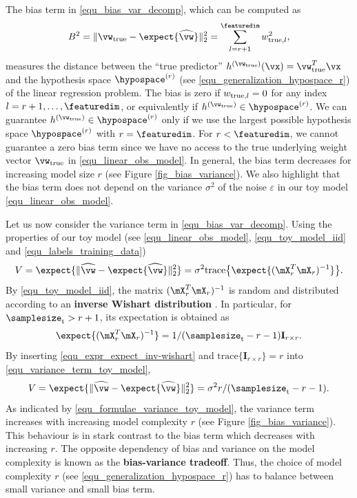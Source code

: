 \documentclass[12pt]{report}
\begin{document}
The bias term in \eqref{equ_bias_var_decomp}, which can be computed as 
\vspace*{-3mm}
\begin{equation}
\label{equ_def_bias_term}
B^{2} = \| \vw_{\rm true} - \expect \{ \widehat{\vw} \} \|^{2}_{2} = \sum_{l=r+1}^{\featuredim} w_{{\rm true},l}^2, 
\end{equation} 
measures the distance between the ``true predictor'' $h^{(\vw_{\rm true})}(\vx)=\vw_{\rm true}^{T} \vx$ and the 
hypothesis space $\hypospace^{(r)}$ (see \eqref{equ_generalization_hypospace_r}) of the linear regression problem. 
The bias is zero if $w_{{\rm true},l}=0$ for any index $l=r+1,\ldots,\featuredim$, or equivalently if $h^{(\vw_{\rm true})} \in \hypospace^{(r)}$. 
We can guarantee $h^{(\vw_{\rm true})} \in \hypospace^{(r)}$ only if we use the largest possible hypothesis 
space $\hypospace^{(r)}$ with $r=\featuredim$. For $r < \featuredim$, we cannot guarantee a zero bias term since we 
have no access to the true underlying weight vector $\vw_{\rm true}$ in \eqref{equ_linear_obs_model}. In general, the 
bias term decreases for increasing model size $r$ (see Figure \ref{fig_bias_variance}). We also highlight that the bias 
term does not depend on the variance $\sigma^{2}$ of the noise $\varepsilon$ in our toy model \eqref{equ_linear_obs_model}. 

Let us now consider the variance term in \eqref{equ_bias_var_decomp}. Using the properties of our toy model 
(see \eqref{equ_linear_obs_model}, \eqref{equ_toy_model_iid} and \eqref{equ_labels_training_data})
\begin{equation}
\label{equ_variance_term_toy_model}
V = \expect \{ \| \widehat{\vw} - \expect\{ \widehat{\vw} \} \|^{2}_{2} \} = \sigma^{2} \mbox{trace} \big\{ \expect\{(\mX_{r}^{T} \mX_{r})^{-1} \} \big\}.
\end{equation} 
By \eqref{equ_toy_model_iid}, the matrix $(\mX_{r}^{T} \mX_{r})^{-1}$ is random and distributed according to an 
{\bf inverse Wishart distribution} \cite{Mardia1979}. In particular, for $\samplesize_{\rm t} > r +1$, its expectation 
is obtained as 
\begin{equation} 
\label{equ_expr_expect_inv-wishart}
\expect\{(\mX_{r}^{T} \mX_{r})^{-1} \} = 1/(\samplesize_{\rm t}-r-1) \mathbf{I}_{r \times r}.
\end{equation} 
By inserting \eqref{equ_expr_expect_inv-wishart} and $\mbox{trace} \{ \mathbf{I}_{r \times r} \} = r$ into \eqref{equ_variance_term_toy_model}, 
\begin{equation} 
\label{equ_formulae_variance_toy_model}
V= \expect \{ \| \widehat{\vw} - \expect\{ \widehat{\vw} \} \|^{2}_{2} \} = \sigma^{2} r/(\samplesize_{\rm t}-r-1). 
\end{equation} 
As indicated by \eqref{equ_formulae_variance_toy_model}, the variance term increases with increasing model 
complexity $r$ (see Figure \ref{fig_bias_variance}). This behaviour is in stark contrast to the bias term which 
decreases with increasing $r$. The opposite dependency of bias and variance on the model complexity is known 
as the {\bf bias-variance tradeoff}. Thus, the choice of model complexity $r$ (see \eqref{equ_generalization_hypospace_r}) 
has to balance between small variance and small bias term. 
\end{document}
